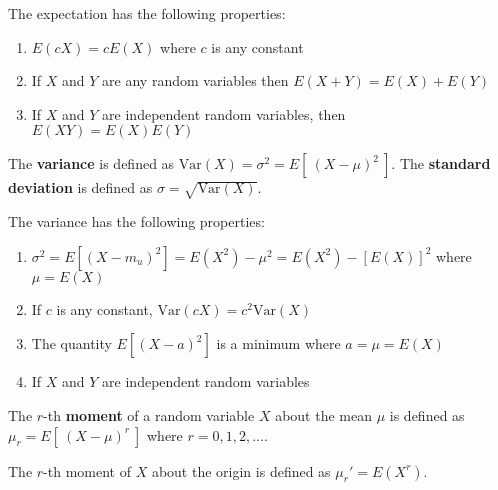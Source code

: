 \begin{samepage}
\begin{thm}  
    The expectation has the following properties:

    \begin{enumerate}
        \item $E(c X) = c E(X)$ where $c$ is any constant
        \item If $X$ and $Y$ are any random variables then $E(X + Y) = E(X) + E(Y)$
        \item If $X$ and $Y$ are independent random variables, then $E(XY) = E(X)E(Y)$
    \end{enumerate}
\end{thm}
\end{samepage}

\begin{defn}
    The \textbf{variance} is defined as $\text{Var} (X) = \sigma ^2 = E[ \  (X - \mu)^2 \  ]$.
    The \textbf{standard deviation} is defined as $\sigma = \sqrt{\text{Var} (X)}$.
\end{defn}

\begin{samepage}
\begin{thm}
    The variance has the following properties:

    \begin{enumerate}
        \item $\sigma ^2 = E\left [ \left (X - m_u\right ) ^2 \right ] = E\left (X ^2\right ) - \mu ^2 = E\left (X ^2\right ) - \left [E\left (X\right )\right ] ^2$ where $\mu = E\left (X\right )$
        \item If $c$ is any constant, $\text{Var}(cX) = c^2 \text{Var}(X)$
        \item The quantity $E[ (X - a)^2 ]$ is a minimum where $a = \mu = E(X)$
        \item If $X$ and $Y$ are independent random variables
    \end{enumerate}
\end{thm}
\end{samepage}

\begin{defn}[Moments]
    The $r$-th \textbf{moment} of a random variable $X$ about the mean $\mu$ is defined as $\mu_r = E[\  (X - \mu)^r \ ]$ where $r=0, 1, 2, ...$. 

    The $r$-th moment of $X$ about the origin is defined as $\mu_r ' = E(X^r)$.
\end{defn}

